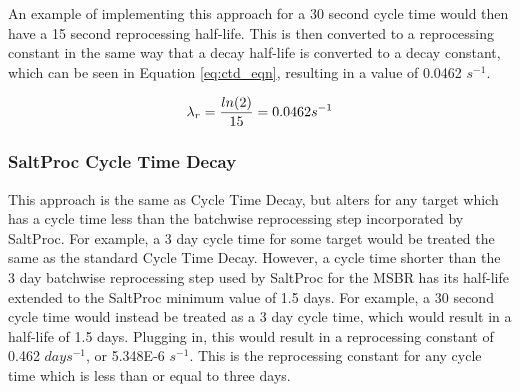 
An example of implementing this approach for a 30 second cycle time would then have a 15 second reprocessing half-life. This is then converted to a reprocessing constant in the same way that a decay half-life is converted to a decay constant, which can be seen in Equation \eqref{eq:ctd_eqn}, resulting in a value of 0.0462 $s^{-1}$.

\begin{equation} \hfill
\lambda_{r} = \frac{ln(2)}{15} = 0.0462 s^{-1}
\hfill\label{eq:ctd_eqn} \end{equation}

\subsubsection{SaltProc Cycle Time Decay}

This approach is the same as Cycle Time Decay, but alters for any target which has a cycle time less than the batchwise reprocessing step incorporated by SaltProc. For example, a 3 day cycle time for some target would be treated the same as the standard Cycle Time Decay. However, a cycle time shorter than the 3 day batchwise reprocessing step used by SaltProc for the MSBR has its half-life extended to the SaltProc minimum value of 1.5 days. For example, a 30 second cycle time would instead be treated as a 3 day cycle time, which would result in a half-life of 1.5 days. Plugging in, this would result in a reprocessing constant of 0.462 $days^{-1}$, or 5.348E-6 $s^{-1}$. This is the reprocessing constant for any cycle time which is less than or equal to three days. 

